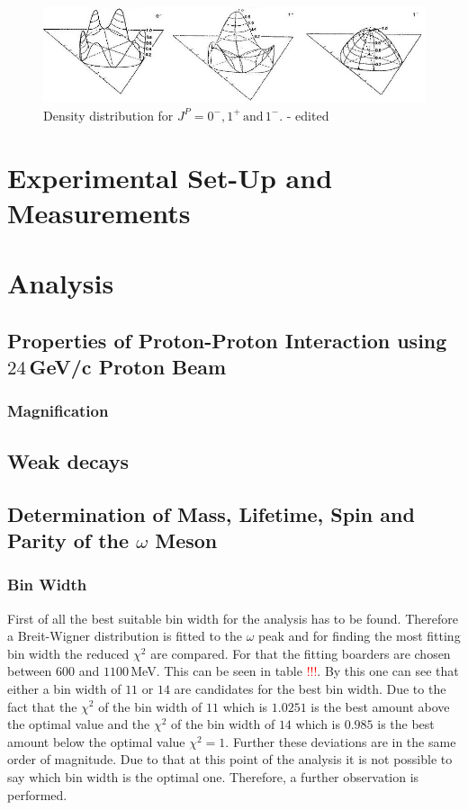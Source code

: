 \documentclass[10pt, a4paper, notitlepage, DIV=15]{scrartcl}
\begin{document}
\begin{figure}[h]
	\centering
	\includegraphics[width=1\textwidth]{density_theo}
	\caption{Density distribution for $J^P=0^-, 1^+ \,\text{and}\, 1^-$. \cite{description} - edited}
	\label{fig:density_theo}
\end{figure}

\section{Experimental Set-Up and Measurements}

\section{Analysis}
\subsection{Properties of Proton-Proton Interaction using $24\,$GeV/c Proton Beam}
\subsubsection{Magnification}
\subsection{Weak decays}
\subsection{Determination of Mass, Lifetime, Spin and Parity of the $\omega$ Meson}
\subsubsection{Bin Width}
First of all the best suitable bin width for the analysis has to be found. Therefore a Breit-Wigner distribution is fitted to the $\omega$ peak and for finding the most fitting bin width the reduced $\chi^2$ are compared. For that the fitting boarders are chosen between $600$ and $1100\,$MeV. This can be seen in table \textcolor{red}{!!!}. By this one can see that either a bin width of $11$ or $14$ are candidates for the best bin width. Due to the fact that the $\chi^2$ of the bin width of $11$ which is $1.0251$ is the best amount above the optimal value and the $\chi^2$ of the bin width of $14$ which is $0.985$ is the best amount below the optimal value $\chi^2=1$. Further these deviations are in the same order of magnitude. Due to that at this point of the analysis it is not possible to say which bin width is the optimal one. Therefore, a further observation is performed.
\end{document}
